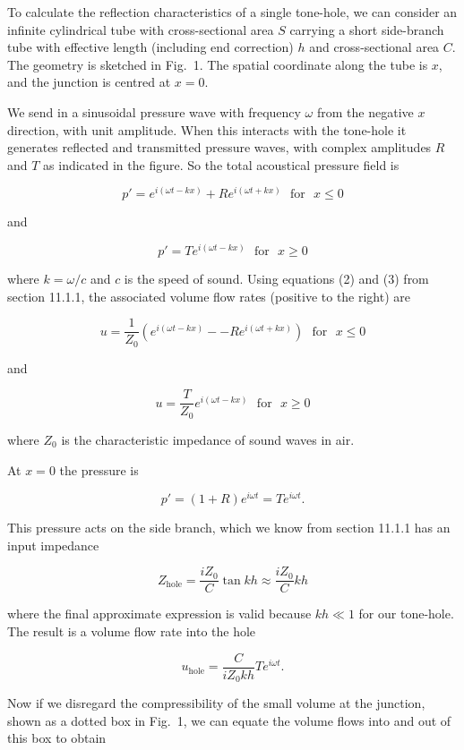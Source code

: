   To calculate the reflection characteristics of a single tone-hole, we can 
  consider an infinite cylindrical tube with cross-sectional area $S$ carrying 
  a short side-branch tube with effective length (including end correction) $h$ 
  and cross-sectional area $C$. The geometry is sketched in Fig.\ 1. The 
  spatial coordinate along the tube is $x$, and the junction is centred at 
  $x=0$. 

  We send in a sinusoidal pressure wave with frequency $\omega$ from the 
  negative $x$ direction, with unit amplitude. When this interacts with the 
  tone-hole it generates reflected and transmitted pressure waves, with complex 
  amplitudes $R$ and $T$ as indicated in the figure. So the total acoustical 
  pressure field is 

  $$p'=e^{i(\omega t -kx)} + R e^{i(\omega t +kx)} \mathrm{~~~for~~~}x \le 0 
  \tag{1}$$ 

  and 

  $$p'=T e^{i(\omega t -kx)} \mathrm{~~~for~~~}x \ge 0 \tag{2}$$ 

  where $k=\omega /c$ and $c$ is the speed of sound. Using equations (2) and 
  (3) from section 11.1.1, the associated volume flow rates (positive to the 
  right) are 

  $$u=\dfrac{1}{Z_0}\left(e^{i(\omega t -kx)} -- R e^{i(\omega t +kx)} \right) 
  \mathrm{~~~for~~~}x \le 0 \tag{3}$$ 

  and 

  $$u=\dfrac{T}{Z_0} e^{i(\omega t -kx)} \mathrm{~~~for~~~}x \ge 0 \tag{4}$$ 

  where $Z_0$ is the characteristic impedance of sound waves in air. 

  At $x=0$ the pressure is 

  $$p'=(1+R)e^{i \omega t} = Te^{i \omega t} . \tag{5}$$ 

  This pressure acts on the side branch, which we know from section 11.1.1 has 
  an input impedance 

  $$Z_{\mathrm{hole}}=\dfrac{i Z_0}{C} \tan kh \approx \dfrac{i Z_0}{C} kh 
  \tag{6}$$ 

  where the final approximate expression is valid because $kh \ll 1$ for our 
  tone-hole. The result is a volume flow rate into the hole 

  $$u_{\mathrm{hole}}=\dfrac{C}{iZ_0 kh}T e^{i \omega t} . \tag{7}$$ 

  Now if we disregard the compressibility of the small volume at the junction, 
  shown as a dotted box in Fig.\ 1, we can equate the volume flows into and out 
  of this box to obtain 

